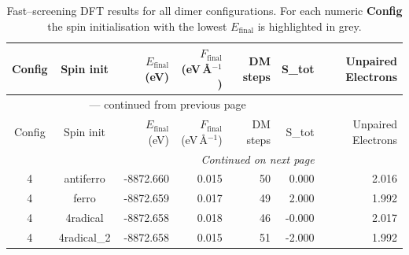 
\begin{longtable}{@{}ccrrrrr@{}}
\caption{Fast–screening DFT results for all dimer configurations.
         For each numeric \textbf{Config} the spin initialisation with the
         lowest $E_{\mathrm{final}}$ is highlighted in grey.}\label{tab:dimer_full}\\
\toprule
Config & Spin init & $E_{\mathrm{final}}$ (eV) &
$F_{\mathrm{final}}$ (eV\,\AA$^{-1}$) & DM steps & S_{tot} & Unpaired Electrons\\
\midrule
\endfirsthead
\multicolumn{6}{c}{{\tablename}~\thetable{} — continued from previous page}\\
\toprule
Config & Spin init & $E_{\mathrm{final}}$ (eV) &
$F_{\mathrm{final}}$ (eV\,\AA$^{-1}$) & DM steps & S_{tot} & Unpaired Electrons\\
\midrule
\endhead
\midrule
\multicolumn{6}{r}{\emph{Continued on next page}}\\
\endfoot
\bottomrule
\endlastfoot
\rowcolor{gray!20} 4 & antiferro & -8872.660 & 0.015 & 50 & 0.000 & 2.016 \\
4 & ferro & -8872.659 & 0.017 & 49 & 2.000 & 1.992 \\
4 & 4radical & -8872.658 & 0.018 & 46 & -0.000 & 2.017 \\
4 & 4radical\_2 & -8872.658 & 0.015 & 51 & -2.000 & 1.992 \\
\end{longtable}